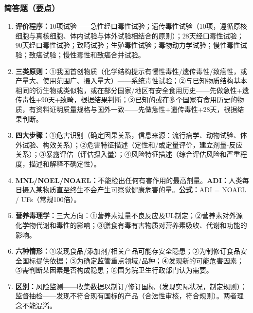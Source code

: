{\subsubsection*{简答题（要点）}

\begin{enumerate}[leftmargin=*, itemsep=6pt]
    \item \textbf{评价程序：}10项试验——急性经口毒性试验；遗传毒性试验（10项，遵循原核细胞与真核细胞、体内试验与体外试验相结合的原则）；28天经口毒性试验；90天经口毒性试验；致畸试验；生殖毒性试验；毒物动力学试验；慢性毒性试验；致癌试验；慢性毒性和致癌合并试验。
    \item \textbf{三类原则：}①我国首创物质（化学结构提示有慢性毒性/遗传毒性/致癌性，或产量大、使用范围广、摄入量大）——系统毒性试验；②与已知物质结构基本相同的衍生物或类似物，或在部分国家/地区有安全食用历史——先做急性+遗传毒性+90天+致畸，根据结果判断；③已知的或在多个国家有食用历史的物质，有资料证明质量规格与国外一致——先做急性+遗传毒性+28天，根据结果判断。
    \item \textbf{四大步骤：}①危害识别（确定因果关系，信息来源：流行病学、动物试验、体外试验、构效关系）；②危害特征描述（定性和/或定量评价，建立剂量-反应关系）；③暴露评估（评估摄入量）；④风险特征描述（综合评估风险和严重程度，描述和解释不确定性）。
    \item \textbf{MNL/NOEL/NOAEL：}不能检出任何有害作用的最高剂量。\textbf{ADI：}人类每日摄入某物质直至终生不会产生可察觉健康危害的量。\textbf{公式：}ADI = NOAEL / UFs（常规100倍）。
    \item \textbf{营养毒理学：}三大方向：①营养素过量不良反应及UL制定；②营养素对外源化学物代谢和毒性的影响；③膳食有毒有害物质对营养素吸收、代谢和功能的影响。
    \item \textbf{六种情形：}①发现食品/添加剂/相关产品可能存安全隐患；②为制修订食品安全国标提供依据；③为确定监管重点领域/品种；④发现新的可能危害因素；⑤需判断某因素是否构成隐患；⑥国务院卫生行政部门认为需要。
    \item \textbf{区别：}风险监测——收集数据以制订/修订国标（发现实际状况，制定规则）；监督抽检——发现不符合现有国标的产品（合法性审核，符合规则）。两者理念不能混淆。
\end{enumerate}

\newpage
}
